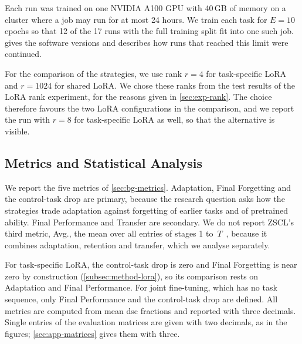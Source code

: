 Each run was trained on one NVIDIA A100 GPU with 40\,GB of memory on a cluster where a job may run for at most 24 hours.
We train each task for $E = 10$ epochs so that 12 of the 17 runs with the full training split fit into one such job.
 gives the software versions and describes how runs that reached this limit were continued.

For the comparison of the strategies, we use rank $r = 4$ for task-specific LoRA and $r = 1024$ for shared LoRA.
We chose these ranks from the test results of the LoRA rank experiment, for the reasons given in \cref{sec:exp-rank}.
The choice therefore favours the two LoRA configurations in the comparison, and we report the run with $r = 8$ for task-specific LoRA as well, so that the alternative is visible.

\subsection{Metrics and Statistical Analysis}
\label{subsec:exp-metrics}

We report the five metrics of \cref{sec:bg-metrics}.
Adaptation, Final Forgetting and the control-task drop are primary, because the research question asks how the strategies trade adaptation against forgetting of earlier tasks and of pretrained ability.
Final Performance and Transfer are secondary.
We do not report ZSCL's third metric, Avg., the mean over all entries of stages 1 to~$T$~\cite[Sec.~4]{zheng2023preventingzeroshottransferdegradation}, because it combines adaptation, retention and transfer, which we analyse separately.

For task-specific LoRA, the control-task drop is zero and Final Forgetting is near zero by construction (\cref{subsec:method-lora}), so its comparison rests on Adaptation and Final Performance.
For joint fine-tuning, which has no task sequence, only Final Performance and the control-task drop are defined.
All metrics are computed from mean \gls{dsc} fractions and reported with three decimals.
Single entries of the evaluation matrices are given with two decimals, as in the figures; \cref{sec:app-matrices} gives them with three.

